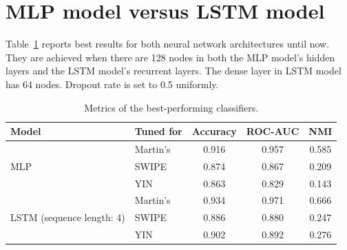\documentclass[11pt,a4paper]{report}
\begin{document}
\newpage

\section{MLP model versus LSTM model}

Table~\ref{tab:metrics} reports best results for both neural network architectures until now.
They are achieved when there are 128 nodes in both the MLP model's hidden layers and the LSTM model's recurrent layers.
The dense layer in LSTM model has 64 nodes.
Dropout rate is set to 0.5 uniformly.

\begin{table}[htbp]
  \centering
  \begin{tabular}{llccc}
  	\toprule
  	Model                                      & Tuned for & Accuracy & ROC-AUC &  NMI  \\
  	\midrule
  	\multirow{3}{*}{MLP}                       & Martin's  &  0.916   &  0.957  & 0.585 \\
  	                                           & SWIPE     &  0.874   &  0.867  & 0.209 \\
  	                                           & YIN       &  0.863   &  0.829  & 0.143 \\
  	\midrule
  	\multirow{3}{*}{LSTM (sequence length: 4)} & Martin's  &  0.934   &  0.971  & 0.666 \\
  	                                           & SWIPE     &  0.886   &  0.880  & 0.247 \\
  	                                           & YIN       &  0.902   &  0.892  & 0.276 \\
  	\bottomrule
  \end{tabular}
  \caption{Metrics of the best-performing classifiers.} \label{tab:metrics}
\end{table}
\end{document}
